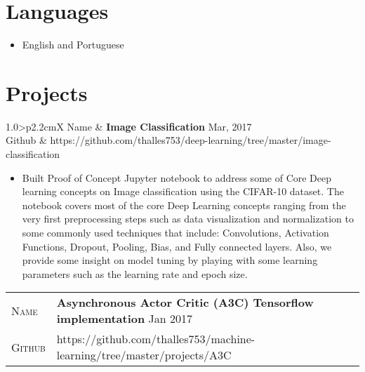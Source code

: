 \documentclass[10pt, a4paper, oneside, final]{scrartcl} %
\newcommand{\gray}{\rowcolor[gray]{.90}} %
\begin{document}

\section{Languages}

\begin{itemize} \itemsep1.5pt \parskip0pt 
  \item English and Portuguese 
\end{itemize}



\section{Projects}

\begin{center}
\begin{tabularx}{1.0\linewidth}{>{\raggedleft\scshape}p{2.2cm}X}
\gray Name & \textbf{Image Classification} \hfill Mar, 2017\\
\gray Github & https://github.com/thalles753/deep-learning/tree/master/image-classification \\
\end{tabularx}
\end{center}

\begin{itemize}\itemsep1.5pt
\item Built Proof of Concept Jupyter notebook to address some of Core Deep learning concepts on Image classification using the CIFAR-10 dataset. The notebook covers most of the core Deep Learning concepts ranging from the very first preprocessing steps such as data visualization and normalization to some commonly used techniques that include: Convolutions, Activation Functions, Dropout, Pooling, Bias, and Fully connected layers. Also, we provide some insight on model tuning by playing with some learning parameters such as the learning rate and epoch size.
\end{itemize}

\begin{center}
\begin{tabularx}{1.0\linewidth}{>{\raggedleft\scshape}p{2.2cm}X}
\gray Name & \textbf{Asynchronous Actor Critic (A3C) Tensorflow implementation} \hfill Jan 2017\\
\gray Github & https://github.com/thalles753/machine-learning/tree/master/projects/A3C \\
\end{tabularx}
\end{center}
\end{document}
